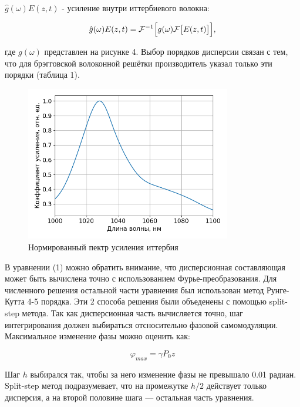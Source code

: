 \documentclass[12pt]{article}
\begin{document}
$\hat{g}(\omega)E(z, t)$ - усиление внутри иттербиевого волокна:

\begin{equation}
    \hat{g}(\omega)E(z, t) = \mathcal{F}^{-1} \Bigl[ g(\omega)\mathcal{F} \bigr[ E(z, t) \bigr] \Bigr],
\end{equation}

где $g(\omega)$ представлен на рисунке 4. Выбор порядков дисперсии связан с тем, что для брэгговской волоконной решётки
производитель указал только эти порядки (таблица 1).

\begin{figure}[h]
    \centering
    \includegraphics[trim=0 30 0 0, width=0.8\textwidth]{Images/Спектр усиления.png}
    \caption{Нормированный пектр усиления иттербия}
    \label{fig:rotated}
\end{figure}

В уравнении (1) можно обратить внимание, что дисперсионная составляющая может быть вычислена точно с использованием
Фурье-преобразования. Для численного решения остальной части уравнения был использован метод Рунге-Кутта 4-5 порядка.
Эти 2 способа решения были объеденены с помощью split-step метода. Так как дисперсионная часть вычисляется точно,
шаг интегрирования должен выбираться отсносительно фазовой самомодуляции. Максимальное изменение фазы можно оценить как:

\begin{equation}
    \varphi_{max} = \gamma P_0 z
\end{equation}

Шаг $h$ выбирался так, чтобы за него изменение фазы не превышало 0.01 радиан. Split-step метод подразумевает, что на
промежутке $h/2$ действует только дисперсия, а на второй половине шага — остальная часть уравнения.
\end{document}
